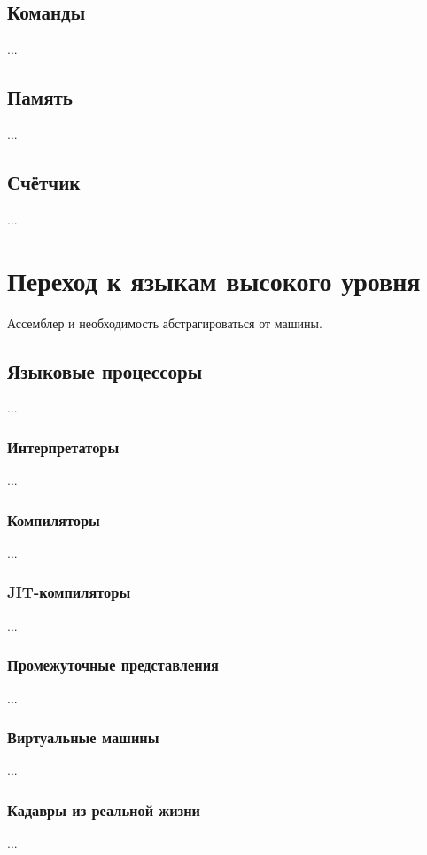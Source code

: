 \documentclass[11pt]{book}
\begin{document}
\section{Команды}
...
\section{Память}
...
\section{Счётчик}
...
\chapter{Переход к языкам высокого уровня}
Ассемблер и необходимость абстрагироваться от машины.

\section{Языковые процессоры}
...
\subsection{Интерпретаторы}
...
\subsection{Компиляторы}
...
\subsection{JIT-компиляторы}
...
\subsection{Промежуточные представления}
...
\subsection{Виртуальные машины}
...
\subsection{Кадавры из реальной жизни}
...
\end{document}
